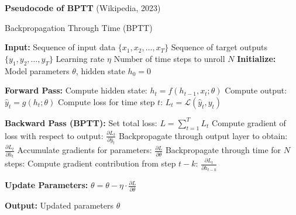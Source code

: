 \documentclass[12pt,a4paper]{article}
\begin{document}
\newpage
\textbf{Pseudocode of BPTT} (Wikipedia, 2023)
\begin{algorithm}[H]
    \caption{Backpropagation Through Time (BPTT)}
    \begin{algorithmic}[1]
    \STATE \textbf{Input:} 
    \STATE \hspace{1em} Sequence of input data $\{x_1, x_2, \dots, x_T\}$
    \STATE \hspace{1em} Sequence of target outputs $\{y_1, y_2, \dots, y_T\}$
    \STATE \hspace{1em} Learning rate $\eta$
    \STATE \hspace{1em} Number of time steps to unroll $N$
    \STATE \textbf{Initialize:} Model parameters $\theta$, hidden state $h_0 = 0$
    
    \STATE \textbf{Forward Pass:}
        \STATE Compute hidden state: $h_t = f(h_{t-1}, x_t; \theta)$
        \STATE Compute output: $\hat{y}_t = g(h_t; \theta)$
        \STATE Compute loss for time step $t$: $L_t = \mathcal{L}(\hat{y}_t, y_t)$
    \ENDFOR
    
    \STATE \textbf{Backward Pass (BPTT):}
    \STATE Set total loss: $L = \sum_{t=1}^{T} L_t$
        \STATE Compute gradient of loss with respect to output: $\frac{\partial L_t}{\partial \hat{y}_t}$
        \STATE Backpropagate through output layer to obtain: $\frac{\partial L_t}{\partial h_t}$
        \STATE Accumulate gradients for parameters: $\frac{\partial L}{\partial \theta}$
            \STATE Backpropagate through time for $N$ steps:
            \STATE Compute gradient contribution from step $t-k$: $\frac{\partial L_t}{\partial h_{t-k}}$
        \ENDFOR
    \ENDFOR
    
    \STATE \textbf{Update Parameters:}
    \STATE $\theta = \theta - \eta \cdot \frac{\partial L}{\partial \theta}$
    
    \STATE \textbf{Output:} Updated parameters $\theta$
    \end{algorithmic}
\end{algorithm}
\end{document}
